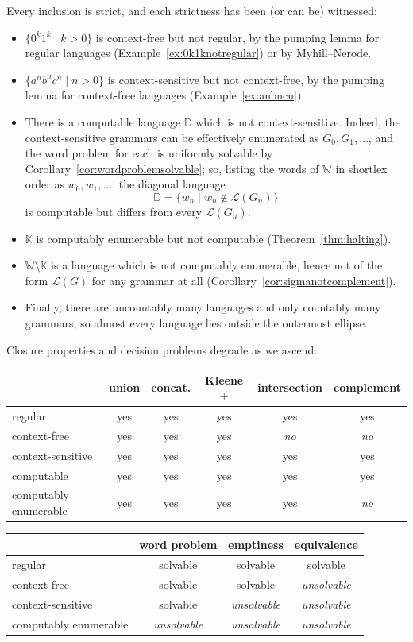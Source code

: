 \documentclass[a4paper]{scrartcl}
\newcommand{\WW}{\mathbb{W}}
\newcommand{\KK}{\mathbb{K}}
\newcommand{\lang}{\mathcal{L}}
\begin{document}
Every inclusion is strict, and each strictness has been (or can be) witnessed:
\begin{itemize}
	\item $\{0^k1^k \mid k > 0\}$ is context-free but not regular, by the pumping lemma for regular languages (Example~\ref{ex:0k1knotregular}) or by Myhill--Nerode.
	\item $\{a^nb^nc^n \mid n > 0\}$ is context-sensitive but not context-free, by the pumping lemma for context-free languages (Example~\ref{ex:anbncn}).
	\item There is a computable language $\mathbb{D}$ which is not context-sensitive. Indeed, the context-sensitive grammars can be effectively enumerated as $G_0, G_1, \dots$, and the word problem for each is uniformly solvable by Corollary~\ref{cor:wordproblemsolvable}; so, listing the words of $\WW$ in shortlex order as $w_0, w_1, \dots$, the diagonal language
	$$\mathbb{D} = \{w_n \mid w_n \notin \lang(G_n)\}$$
	is computable but differs from every $\lang(G_n)$.
	\item $\KK$ is computably enumerable but not computable (Theorem~\ref{thm:halting}).
	\item $\WW\setminus\KK$ is a language which is not computably enumerable, hence not of the form $\lang(G)$ for any grammar at all (Corollary~\ref{cor:sigmanotcomplement}).
	\item Finally, there are uncountably many languages and only countably many grammars, so almost every language lies outside the outermost ellipse.
\end{itemize}

Closure properties and decision problems degrade as we ascend:
\begin{center}
	\begin{tabular}{l|ccccc}
		 & union & concat. & Kleene $+$ & intersection & complement \\\hline
		regular & yes & yes & yes & yes & yes \\
		context-free & yes & yes & yes & \emph{no} & \emph{no} \\
		context-sensitive & yes & yes & yes & yes & yes \\
		computable & yes & yes & yes & yes & yes \\
		computably enumerable & yes & yes & yes & yes & \emph{no}
	\end{tabular}
\end{center}
\begin{center}
	\begin{tabular}{l|ccc}
		 & word problem & emptiness & equivalence \\\hline
		regular & solvable & solvable & solvable \\
		context-free & solvable & solvable & \emph{unsolvable} \\
		context-sensitive & solvable & \emph{unsolvable} & \emph{unsolvable} \\
		computably enumerable & \emph{unsolvable} & \emph{unsolvable} & \emph{unsolvable}
	\end{tabular}
\end{center}
\end{document}
